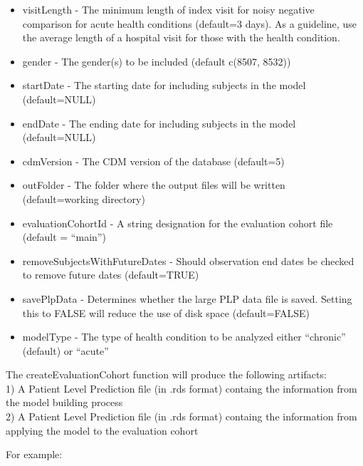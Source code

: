 \documentclass[
]{article}
\begin{document}
\begin{itemize}
\item
  visitLength - The minimum length of index visit for noisy negative
  comparison for acute health conditions (default=3 days). As a
  guideline, use the average length of a hospital visit for those with
  the health condition.
\item
  gender - The gender(s) to be included (default c(8507, 8532))
\item
  startDate - The starting date for including subjects in the model
  (default=NULL)
\item
  endDate - The ending date for including subjects in the model
  (default=NULL)
\item
  cdmVersion - The CDM version of the database (default=5)
\item
  outFolder - The folder where the output files will be written
  (default=working directory)
\item
  evaluationCohortId - A string designation for the evaluation cohort
  file (default = ``main'')\\
\item
  removeSubjectsWithFutureDates - Should observation end dates be
  checked to remove future dates (default=TRUE)
\item
  savePlpData - Determines whether the large PLP data file is saved.
  Setting this to FALSE will reduce the use of disk space
  (default=FALSE)
\item
  modelType - The type of health condition to be analyzed either
  ``chronic'' (default) or ``acute''
\end{itemize}

The createEvaluationCohort function will produce the following
artifacts:\\
1) A Patient Level Prediction file (in .rds format) containg the
information from the model building process\\
2) A Patient Level Prediction file (in .rds format) containg the
information from applying the model to the evaluation cohort

For example:
\end{document}
